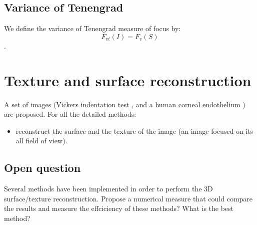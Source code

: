 \subsection{Variance of Tenengrad}
 We define the variance of Tenengrad measure of focus by:
$$F_{vt}(I)=F_v(S)$$.

\section{Texture and surface reconstruction}
\begin{qbox}
A set of images (Vickers indentation test \cite{Fernandes2010}, and a human corneal endothelium \cite{Fernandes2012}) are proposed.
For all the detailed methods:
\begin{itemize}
 \item reconstruct the surface and the texture of the image (an image focused on its all field of view).

\end{itemize}

\end{qbox}

\subsection{Open question}
\begin{qbox}
Several methods have been implemented in order to perform the 3D surface/texture reconstruction. Propose a numerical measure that could compare the results and measure the effciciency of these methods? What is the best method?
\end{qbox}


